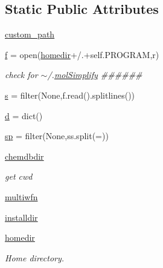 \subsection*{Static Public Attributes}
\begin{DoxyCompactItemize}
\item 
\hyperlink{classmolSimplify_1_1Classes_1_1globalvars_1_1globalvars_ab901d2648438d3d5221a82ead538a1e3}{custom\+\_\+path}
\item 
\hyperlink{classmolSimplify_1_1Classes_1_1globalvars_1_1globalvars_a863d42337d2c17f536bdc70aab110e55}{f} = open(\hyperlink{classmolSimplify_1_1Classes_1_1globalvars_1_1globalvars_ac3e8c6e060e424b71ba74f41532968ed}{homedir}+\textquotesingle{}/.\textquotesingle{}+self.\+P\+R\+O\+G\+R\+AM,\textquotesingle{}r\textquotesingle{})
\begin{DoxyCompactList}\small\item\em check for $\sim$/.\hyperlink{namespacemolSimplify}{mol\+Simplify} \#\#\#\#\#\# \end{DoxyCompactList}\item 
\hyperlink{classmolSimplify_1_1Classes_1_1globalvars_1_1globalvars_aa5b2e18be9621e2aaad51cf828579480}{s} = filter(None,f.\+read().splitlines())
\item 
\hyperlink{classmolSimplify_1_1Classes_1_1globalvars_1_1globalvars_a6f6cbeb33cab48fc8c72d78b884571ea}{d} = dict()
\item 
\hyperlink{classmolSimplify_1_1Classes_1_1globalvars_1_1globalvars_ac751358fbd2e3facd739964f49c58a26}{sp} = filter(None,ss.\+split(\textquotesingle{}=\textquotesingle{}))
\item 
\hyperlink{classmolSimplify_1_1Classes_1_1globalvars_1_1globalvars_acbf263b1fb0be5fb9bbdb6c1ad595378}{chemdbdir}
\begin{DoxyCompactList}\small\item\em get cwd \end{DoxyCompactList}\item 
\hyperlink{classmolSimplify_1_1Classes_1_1globalvars_1_1globalvars_ac6253c474db3b3aa379204728db93417}{multiwfn}
\item 
\hyperlink{classmolSimplify_1_1Classes_1_1globalvars_1_1globalvars_a87b88e4c146a1f1dd471bd058722ea43}{installdir}
\item 
\hyperlink{classmolSimplify_1_1Classes_1_1globalvars_1_1globalvars_ac3e8c6e060e424b71ba74f41532968ed}{homedir}
\begin{DoxyCompactList}\small\item\em Home directory. \end{DoxyCompactList}\item 

\end{DoxyCompactItemize}

